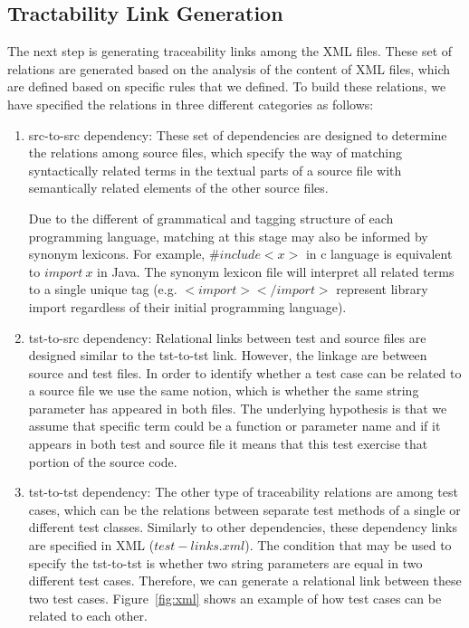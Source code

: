 \subsection{Tractability Link Generation}
The next step is generating traceability links among the XML files. 
These set of relations are generated based on the analysis of 
the content of XML files, which are defined based on specific 
rules that we defined. 
To build these relations, we have specified the relations
in three different categories as follows:

\begin{enumerate}
	
	\item src-to-src dependency: 
	These set of dependencies are designed to determine the
	relations among source files, which specify the way of matching syntactically 
	related terms in the textual parts of a source file  with semantically 
	related elements of the other source files.
	
	Due to the different of grammatical and tagging structure of 
	each programming language, matching at this stage may also
	be informed by synonym lexicons. 
	For example, $\#include <x>$ in c language is equivalent to 
	$import \: x$  in Java. 
	The synonym lexicon file will interpret all 
	related terms to a single unique tag
	(e.g. $<import> </import>$ represent library import 
	regardless of their initial programming language). 
	
	

	\item tst-to-src dependency: 
	Relational links between test and source files are designed similar
	to the tst-to-tst link. However, the linkage
	are between source and test files. 
	In order to identify whether a test case can be 
	related to a source file we use the same notion, which 
	is whether the same string parameter has appeared in
	both files. 
	The underlying hypothesis is that
	we assume that specific term could be a function or
	parameter name and if it appears in both test 
	and source file it means that this test 
	exercise that portion of the source code. 
	
	\item tst-to-tst dependency: 	
	The other type of traceability relations are among test cases, 
	which can be the relations between separate test methods of 
	a single or different test classes.  
	Similarly to other dependencies, these dependency 
	links are specified in XML ($test-links.xml$). 
	The condition that may be used to specify the
	tst-to-tst is whether two string parameters are equal in 
	two different test cases. Therefore, we can generate a relational link
	between these two test cases.
	Figure~\ref{fig:xml} shows an example of how test cases can 
	be related to each other. 
	
	

	
	
	
\end{enumerate}

